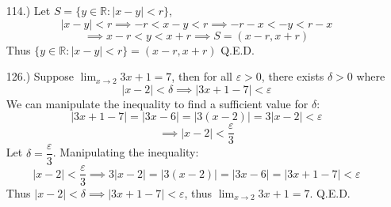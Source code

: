 \documentclass[12pt]{article}
\newcommand{\vertb}[1]{\left\vert#1\right\vert}
\newcommand{\e}{\varepsilon}
\newcommand{\lm}[1]{\displaystyle\lim_{#1}}
\begin{document}
\begin{itemize}














    \item [114.)] Let $S=\{y\in\mathbb{R}:\vertb{x-y}<r\}$,
    \[\vertb{x-y}<r\implies-r<x-y<r\implies -r-x<-y<r-x\]
    \[\implies x-r<y<x+r\implies S=(x-r,x+r)\]
    Thus $\{y\in\mathbb{R}:\vertb{x-y}<r\}=(x-r,x+r)$ Q.E.D.







    \pagebreak
    \item [126.)] Suppose $\lm{x\to2}3x+1=7$, then for all $\varepsilon>0$, there exists $\delta>0$ where
    \[\vertb{x-2}<\delta\implies\vertb{3x+1-7}<\e\]
    We can manipulate the inequality to find a sufficient value for $\delta$:
    \[\vertb{3x+1-7}=\vertb{3x-6}=\vertb{3(x-2)}=3\vertb{x-2}<\e\]
    \[\implies\vertb{x-2}<\frac{\e}{3}\]
    Let $\delta=\dfrac{\e}{3}$. Manipulating the inequality:
    \[\vertb{x-2}<\dfrac{\e}{3}\implies3\vertb{x-2}=\vertb{3(x-2)}=\vertb{3x-6}=\vertb{3x+1-7}<\e\]
    Thus $\vertb{x-2}<\delta\implies\vertb{3x+1-7}<\e$, thus $\lm{x\to2}3x+1=7$. Q.E.D.


\end{itemize}
\end{document}
